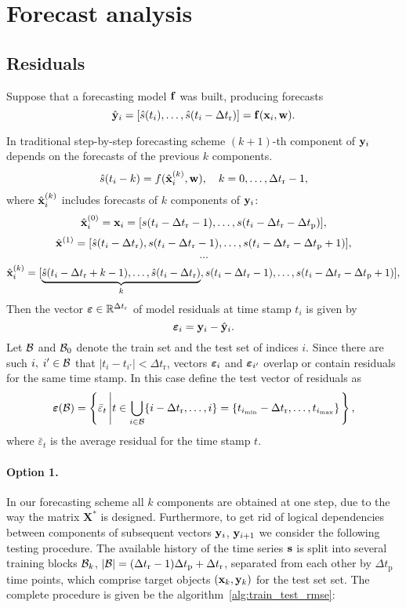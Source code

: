 \documentclass[12pt]{article}
\newcommand{\dtr}{\Delta t_\text{r}}
\newcommand{\dtp}{\Delta t_\text{p}}
\begin{document}
\section{Forecast analysis}
\subsection{Residuals}
Suppose that a forecasting model ${\mathbf{f}}$ was built, producing forecasts
\[\hat{\y}_i = [\hat{s}(t_{i}), \dots, \hat{s}(t_{i}- \dtr)] = \fx(\x_i, \w).\]
 
In traditional step-by-step forecasting scheme $(k+1)$-th component of ${\mathbf{y}}_i$ depends on the forecasts of the previous $k$ components.
\[\hat{s}(t_{i}-k)  = f(\hat{\x}_i^{(k)}, \w), \quad k = 0,\dots, \dtr-1,\]
where $\hat{{\mathbf{x}}}_i^{(k)}$ includes forecasts of $k$  components of ${\mathbf{y}}_i$:
\[\hat{\x}_i^{(0)} = \x_i = [s(t_i - \dtr - 1), \dots, s(t_i - \dtr - \dtp)], \]
\[\hat{\x}^{(1)} = [\hat{s}(t_i - \dtr), s(t_i - \dtr - 1), \dots, s(t_i - \dtr - \dtp + 1)], \]
\[\dots\]
\[\hat{\x}_i^{(k)} = [\underbrace{\hat{s}(t_i - \dtr + k-1), \dots, \hat{s}(t_i - \dtr)}_{k}, s(t_i - \dtr - 1), \dots, s(t_i - \dtr - \dtp + 1)], \]
Then the vector $\veps \in \mathbb{R}^{\dtr}$ of model residuals at time stamp $t_i$ is given by
\[{\boldsymbol{\varepsilon}}_i = {{\mathbf{y}}}_i - \hat{{\mathbf{y}}}_i.\]
Let ${\mathcal{B}}$ and ${\mathcal{B}}_0$ denote the train set and the test set of indices $i$.
Since there are such $i, \; i' \in {\mathcal{B}}$ that $|t_i - t_{i'}| < \dtr$, vectors ${\boldsymbol{\varepsilon}}_i$ and ${\boldsymbol{\varepsilon}}_{i'}$ overlap or contain residuals for the same time stamp. In this case define the test vector of residuals as
\[\veps(\cB) = \left\{\bar{\varepsilon}_t \left| t \in \bigcup_{i \in \cB} \{i-\dtr, \dots, i\} = \{t_{i_{\min}} - \dtr, \dots, t_{i_{\max}}\}\right.\right\}, \]
where $\bar{\varepsilon}_t$ is the average residual for the time stamp $t$.

\paragraph{Option 1.}
In our forecasting scheme all $k$ components are obtained at one step, due to the way the matrix $\mathbf{X}^{*}$ is designed. Furthermore, to get rid of logical dependencies between components of subsequent vectors ${\mathbf{y}}_{i}$, ${\mathbf{y}}_{i+1}$ we consider the following testing procedure. The available history of the time series ${\mathbf{s}}$ is split into several training blocks ${\mathcal{B}}_k$, $|\cB| = (\dtr - 1)\dtp + \dtr$, separated from each other by $\dtp$ time points, which comprise target objects $({\mathbf{x}}_k, {\mathbf{y}}_k)$ for the test set set.
The complete procedure is given be the algorithm~\ref{alg:train_test_rmse}:
\end{document}

